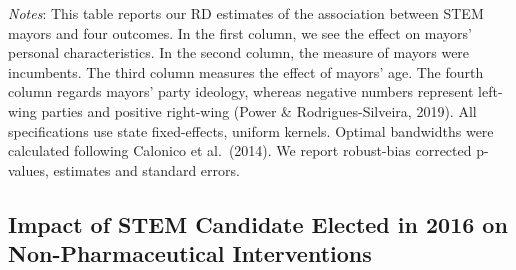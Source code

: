 \documentclass[
  letterpaper,
  DIV=11,
  numbers=noendperiod]{scrartcl}
\begin{document}
\emph{Notes}: This table reports our RD estimates of the association
between STEM mayors and four outcomes. In the first column, we see the
effect on mayors' personal characteristics. In the second column, the
measure of mayors were incumbents. The third column measures the effect
of mayors' age. The fourth column regards mayors' party ideology,
whereas negative numbers represent left-wing parties and positive
right-wing (Power \& Rodrigues-Silveira, 2019). All specifications use
state fixed-effects, uniform kernels. Optimal bandwidths were calculated
following Calonico et al.~(2014). We report robust-bias corrected
p-values, estimates and standard errors.

\subsection{Impact of STEM Candidate Elected in 2016 on
Non-Pharmaceutical
Interventions}\label{impact-of-stem-candidate-elected-in-2016-on-non-pharmaceutical-interventions}
\end{document}
